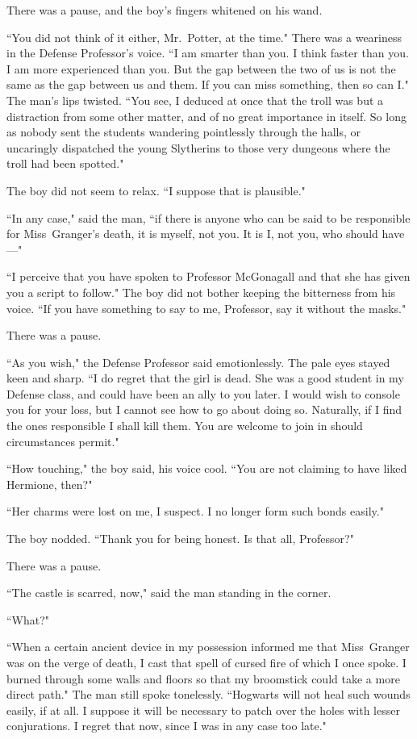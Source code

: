 There was a pause, and the boy's fingers whitened on his wand.

``You did not think of it either, Mr.~Potter, at the time." There was a weariness in the Defense Professor's voice. ``I am smarter than you. I think faster than you. I am more experienced than you. But the gap between the two of us is not the same as the gap between us and them. If you can miss something, then so can I." The man's lips twisted. ``You see, I deduced at once that the troll was but a distraction from some other matter, and of no great importance in itself. So long as nobody sent the students wandering pointlessly through the halls, or uncaringly dispatched the young Slytherins to those very dungeons where the troll had been spotted."

The boy did not seem to relax. ``I suppose that is plausible."

``In any case," said the man, ``if there is anyone who can be said to be responsible for Miss~Granger's death, it is myself, not you. It is I, not you, who should have—"

``I perceive that you have spoken to Professor McGonagall and that she has given you a script to follow." The boy did not bother keeping the bitterness from his voice. ``If you have something to say to me, Professor, say it without the masks."

There was a pause.

``As you wish," the Defense Professor said emotionlessly. The pale eyes stayed keen and sharp. ``I do regret that the girl is dead. She was a good student in my Defense class, and could have been an ally to you later. I would wish to console you for your loss, but I cannot see how to go about doing so. Naturally, if I find the ones responsible I shall kill them. You are welcome to join in should circumstances permit."

``How touching," the boy said, his voice cool. ``You are not claiming to have liked Hermione, then?"

``Her charms were lost on me, I suspect. I no longer form such bonds easily."

The boy nodded. ``Thank you for being honest. Is that all, Professor?"

There was a pause.

``The castle is scarred, now," said the man standing in the corner.

``What?"

``When a certain ancient device in my possession informed me that Miss~Granger was on the verge of death, I cast that spell of cursed fire of which I once spoke. I burned through some walls and floors so that my broomstick could take a more direct path." The man still spoke tonelessly. ``Hogwarts will not heal such wounds easily, if at all. I suppose it will be necessary to patch over the holes with lesser conjurations. I regret that now, since I was in any case too late."

